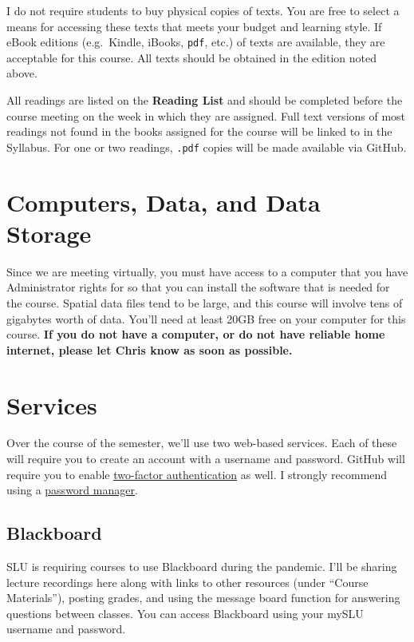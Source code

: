 \documentclass[
]{book}
\begin{document}
I do not require students to buy physical copies of texts. You are free to select a means for accessing these texts that meets your budget and learning style. If eBook editions (e.g.~Kindle, iBooks, \texttt{pdf}, etc.) of texts are available, they are acceptable for this course. All texts should be obtained in the edition noted above.

All readings are listed on the \textbf{Reading List} and should be completed before the course meeting on the week in which they are assigned. Full text versions of most readings not found in the books assigned for the course will be linked to in the Syllabus. For one or two readings, \texttt{.pdf} copies will be made available via GitHub.

\hypertarget{computers-data-and-data-storage}{%
\section{Computers, Data, and Data Storage}\label{computers-data-and-data-storage}}

Since we are meeting virtually, you must have access to a computer that you have Administrator rights for so that you can install the software that is needed for the course. Spatial data files tend to be large, and this course will involve tens of gigabytes worth of data. You'll need at least 20GB free on your computer for this course. \textbf{If you do not have a computer, or do not have reliable home internet, please let Chris know as soon as possible.}

\hypertarget{services}{%
\section{Services}\label{services}}

Over the course of the semester, we'll use two web-based services. Each of these will require you to create an account with a username and password. GitHub will require you to enable \href{https://en.wikipedia.org/wiki/Multi-factor_authentication}{two-factor authentication} as well. I strongly recommend using a \href{https://lifehacker.com/5529133/five-best-password-managers}{password manager}.

\hypertarget{blackboard}{%
\subsection{Blackboard}\label{blackboard}}

SLU is requiring courses to use Blackboard during the pandemic. I'll be sharing lecture recordings here along with links to other resources (under ``Course Materials''), posting grades, and using the message board function for answering questions between classes. You can access Blackboard using your mySLU username and password.
\end{document}
